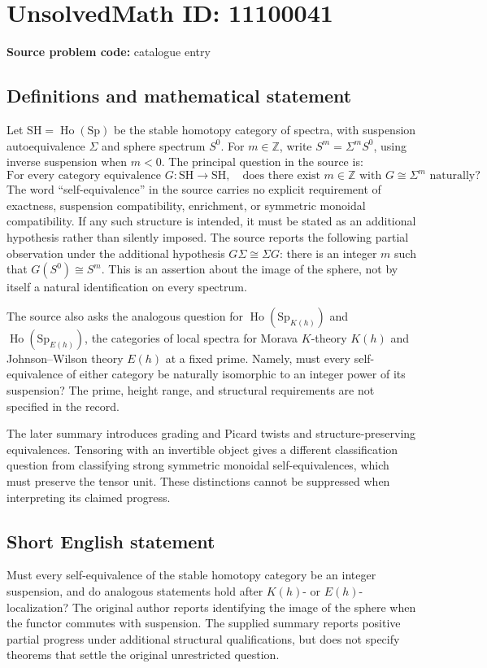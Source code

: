 \documentclass[11pt]{article}
\newcommand{\Z}{\mathbb{Z}}
\begin{document}
\section*{UnsolvedMath ID: 11100041}
\textbf{Source problem code:} catalogue entry
\subsection{Definitions and mathematical statement}
Let $\mathrm{SH}=\operatorname{Ho}(\mathrm{Sp})$ be the stable homotopy category of spectra, with suspension autoequivalence $\Sigma$ and sphere spectrum $S^0$. For $m\in\Z$, write $S^m=\Sigma^m S^0$, using inverse suspension when $m<0$. The principal question in the source is:
\[
 \text{For every category equivalence }G:\mathrm{SH}\longrightarrow\mathrm{SH},
 \quad\text{does there exist }m\in\Z\text{ with }G\cong\Sigma^m\text{ naturally?}
\]
The word ``self-equivalence'' in the source carries no explicit requirement of exactness, suspension compatibility, enrichment, or symmetric monoidal compatibility. If any such structure is intended, it must be stated as an additional hypothesis rather than silently imposed. The source reports the following partial observation under the additional hypothesis $G\Sigma\cong\Sigma G$: there is an integer $m$ such that $G(S^0)\cong S^m$. This is an assertion about the image of the sphere, not by itself a natural identification on every spectrum.

The source also asks the analogous question for $\operatorname{Ho}(\mathrm{Sp}_{K(h)})$ and $\operatorname{Ho}(\mathrm{Sp}_{E(h)})$, the categories of local spectra for Morava $K$-theory $K(h)$ and Johnson--Wilson theory $E(h)$ at a fixed prime. Namely, must every self-equivalence of either category be naturally isomorphic to an integer power of its suspension? The prime, height range, and structural requirements are not specified in the record.

The later summary introduces grading and Picard twists and structure-preserving equivalences. Tensoring with an invertible object gives a different classification question from classifying strong symmetric monoidal self-equivalences, which must preserve the tensor unit. These distinctions cannot be suppressed when interpreting its claimed progress.
\subsection{Short English statement}
Must every self-equivalence of the stable homotopy category be an integer suspension, and do analogous statements hold after $K(h)$- or $E(h)$-localization? The original author reports identifying the image of the sphere when the functor commutes with suspension. The supplied summary reports positive partial progress under additional structural qualifications, but does not specify theorems that settle the original unrestricted question.
\end{document}
